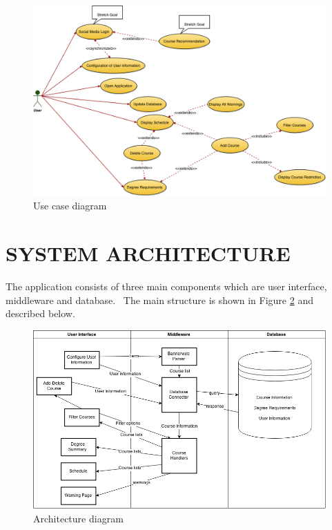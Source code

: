 \documentclass[twoside,letterpaper]{article}
\begin{document}
\begin{figure}[h]
\centering
\includegraphics[width=\linewidth]{usecasediagram.png}
\caption{Use case diagram}
\label{fig:usecase_diagram}
\end{figure}

\clearpage\section[SYSTEM ARCHITECTURE]{\rmfamily\bfseries\color{black}
SYSTEM ARCHITECTURE}

{\color{black}
The application consists of three main components which are user interface, middleware and database. \ The main structure is shown in Figure \ref{fig:architecture_diagram} and described below.}

\begin{figure}[h]
\centering
\includegraphics[width=\linewidth]{architecturediagram.png}
\caption{Architecture diagram}
\label{fig:architecture_diagram}
\end{figure}
\end{document}
